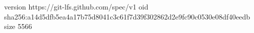 version https://git-lfs.github.com/spec/v1
oid sha256:a14d5dfb5ea4a17b75d8041c3c61f7d39f302862d2e9fc90c0530e08df40eedb
size 5566
